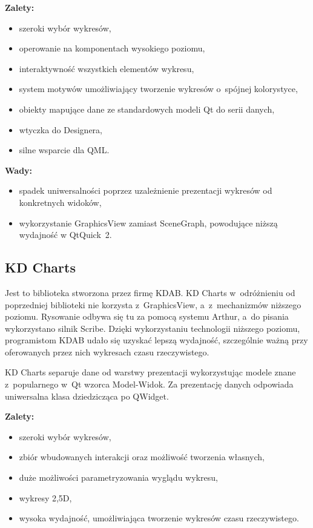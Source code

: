 \textbf{Zalety:}
\begin{itemize}
\item{szeroki wybór wykresów,}
\item{operowanie na komponentach wysokiego poziomu,}
\item{interaktywność wszystkich elementów wykresu,}
\item{system motywów umożliwiający tworzenie wykresów o~spójnej kolorystyce,}
\item{obiekty mapujące dane ze standardowych modeli Qt do serii danych,}
\item{wtyczka do Designera,}
\item{silne wsparcie dla QML.}\newline
\end{itemize}

\textbf{Wady:}
\begin{itemize}
\item{spadek uniwersalności poprzez uzależnienie prezentacji wykresów od konkretnych widoków,}
\item{wykorzystanie GraphicsView zamiast SceneGraph, powodujące niższą wydajność w QtQuick~2.}
\end{itemize}


\subsection{KD Charts}
Jest to biblioteka stworzona przez firmę KDAB. KD Charts w~odróżnieniu od poprzedniej biblioteki nie korzysta z~GraphicsView, a~z~mechanizmów niższego poziomu. Rysowanie odbywa się tu za pomocą systemu Arthur, a~do pisania wykorzystano silnik Scribe.
Dzięki wykorzystaniu technologii niższego poziomu, programistom KDAB udało się uzyskać lepszą wydajność, szczególnie ważną przy oferowanych przez nich wykresach czasu rzeczywistego.\newline

KD Charts separuje dane od warstwy prezentacji wykorzystując modele znane z~popularnego w~Qt wzorca Model-Widok. Za prezentację danych odpowiada uniwersalna klasa dziedzicząca po QWidget.\newline

\textbf{Zalety:}
\begin{itemize}
\item{szeroki wybór wykresów,}
\item{zbiór wbudowanych interakcji oraz możliwość tworzenia własnych,}
\item{duże możliwości parametryzowania wyglądu wykresu,}
\item{wykresy 2,5D,}
\item{wysoka wydajność, umożliwiająca tworzenie wykresów czasu rzeczywistego.}\newline
\end{itemize}

